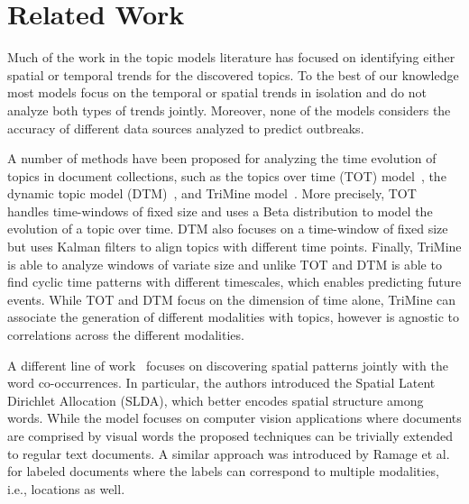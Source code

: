 \documentclass[conference]{IEEEtran}
\begin{document}
%
\section{Related Work}
\label{sec:related_work}
Much of the work in the topic models literature has focused on identifying either spatial or temporal trends for the discovered topics. To the best of our knowledge most models focus on the temporal or spatial trends in isolation and do not analyze both types of trends jointly.  Moreover, none of the models considers the accuracy of different data sources analyzed to predict outbreaks.

A number of methods have been proposed for analyzing the time evolution of topics in document collections, such as the topics over time (TOT) model~\cite{wang:2006}, the dynamic topic model (DTM)~\cite{blei:2006}, and TriMine model~\cite{matsubara:2012}.  More precisely, TOT handles time-windows of fixed size and uses a Beta distribution to model the evolution of a topic over time. DTM  also focuses on a time-window of fixed size but uses Kalman filters to align topics with different time points. Finally, TriMine is able to analyze windows of variate size and unlike TOT and DTM is able to find cyclic time patterns with different timescales, which enables predicting future events. While TOT and DTM focus on the dimension of time alone, TriMine can associate the generation of different modalities with topics, however is agnostic to correlations across the different modalities.

A different line of work~\cite{wang:2007} focuses on discovering spatial patterns jointly with the word co-occurrences. In particular, the authors introduced the Spatial Latent Dirichlet Allocation (SLDA), which better encodes spatial structure among words. While the model focuses on computer vision applications where documents are comprised by visual words the proposed techniques can be trivially extended to regular text documents. A similar approach was introduced by Ramage et al.~\cite{ramage:2009} for labeled documents where the labels can correspond to multiple modalities, i.e., locations as well.
\end{document}

